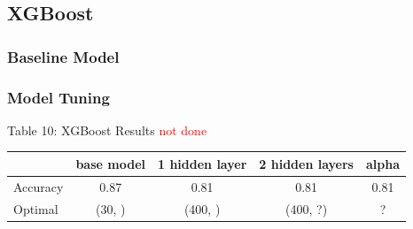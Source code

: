 \documentclass{article}
\newcommand\todo[1]{\textcolor{red}{#1}}
\begin{document}
\subsection{XGBoost}
\subsubsection*{Baseline Model}

\subsubsection*{Model Tuning}
\begin{table}
	
	\centering
	Table 10: XGBoost Results \todo{ not done}\\
	\begin{tabular}{ l c c c c }
		\hline
		& base model & 1 hidden layer & 2 hidden layers & alpha \\
		\hline
		Accuracy & 0.87 & 0.81 & 0.81 & 0.81 \\
		Optimal & (30, ) & (400, ) & (400, ?) & ? \\
		
		
		\hline 
	\end{tabular}
\end{table}
\end{document}
